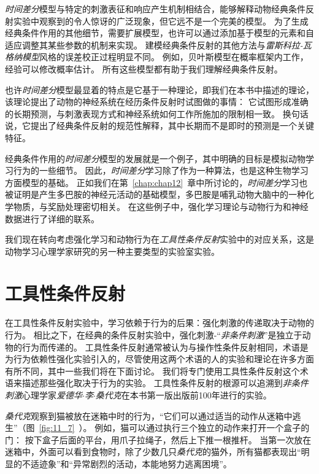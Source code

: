 \textit{时间差分}模型与特定的刺激表征和响应产生机制相结合，能够解释动物经典条件反射实验中观察到的令人惊讶的广泛现象，但它远不是一个完美的模型。
为了生成经典条件作用的其他细节，需要扩展模型，也许可以通过添加基于模型的元素和自适应调整其某些参数的机制来实现。
建模经典条件反射的其他方法与\textit{雷斯科拉-瓦格纳模型}风格的误差校正过程明显不同。
例如，贝叶斯模型在概率框架内工作，经验可以修改概率估计。
所有这些模型都有助于我们理解经典条件反射。


也许\textit{时间差分}模型最显着的特点是它基于一种理论，即我们在本书中描述的理论，该理论提出了动物的神经系统在经历条件反射时试图做的事情：
它试图形成准确的长期预测，与刺激表现方式和神经系统如何工作所施加的限制相一致。
换句话说，它提出了经典条件反射的规范性解释，其中长期而不是即时的预测是一个关键特征。


经典条件作用的\textit{时间差分}模型的发展就是一个例子，其中明确的目标是模拟动物学习行为的一些细节。
因此，\textit{时间差分}学习除了作为一种算法，也是这种生物学习方面模型的基础。
正如我们在第~\ref{chap:chap12}~章中所讨论的，\textit{时间差分}学习也被证明是产生多巴胺的神经元活动的基础模型，多巴胺是哺乳动物大脑中的一种化学物质，与奖励处理密切相关。
在这些例子中，强化学习理论与动物行为和神经数据进行了详细的联系。


我们现在转向考虑强化学习和动物行为在\textit{工具性条件反射}实验中的对应关系，这是动物学习心理学家研究的另一种主要类型的实验室实验。


\section{工具性条件反射} \label{sec:instrumental_conditioning}

在工具性条件反射实验中，学习依赖于行为的后果：强化刺激的传递取决于动物的行为。
相比之下，在经典的条件反射实验中，强化刺激-“\textit{非条件刺激}”是独立于动物的行为而传递的。
工具性条件反射通常被认为与操作性条件反射相同，术语是为行为依赖性强化实验引入的\cite{skinner2019behavior}，尽管使用这两个术语的人的实验和理论在许多方面有所不同，其中一些我们将在下面讨论。
我们将专门使用工具性条件反射这个术语来描述那些强化取决于行为的实验。
工具性条件反射的根源可以追溯到\textit{非条件刺激}心理学家\textit{爱德华$\cdot$李$\cdot$桑代克}在本书第一版出版前100年进行的实验。


\textit{桑代克}观察到猫被放在迷箱中时的行为，“它们可以通过适当的动作从迷箱中逃生”（图~\ref{fig:11_7}~）。
例如，猫可以通过执行三个独立的动作来打开一个盒子的门：
按下盒子后面的平台，用爪子拉绳子，然后上下推一根推杆。
当第一次放在迷箱中，外面可以看到食物时，除了少数几只\textit{桑代克}的猫外，所有猫都表现出“明显的不适迹象”和“异常剧烈的活动，本能地努力逃离困境”\cite{thorndike1898animal}。


